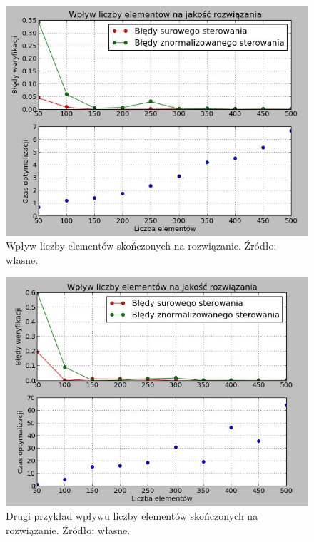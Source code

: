 \begin{figure}[ht]
    \centering
    \includegraphics{Grafika/elements_influence_1-15_50-500}
    \caption{Wpływ liczby elementów skończonych na rozwiązanie. Źródło: własne.}
    \label{fig:elementsinfluence1-15_50-500}
\end{figure}

\begin{figure}[ht]
    \centering
    \includegraphics{Grafika/elements_influence_10-20_50-500}
    \caption{Drugi przykład wpływu liczby elementów skończonych na rozwiązanie. Źródło: własne.}
    \label{fig:elementsinfluence10-2050-500}
\end{figure}


